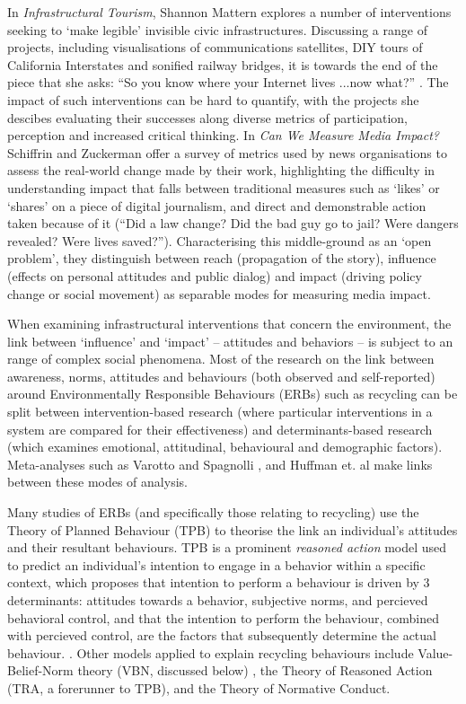 \documentclass[nofonts,nols,justified,nobib]{tufte-book}
\begin{document}
In \emph{Infrastructural Tourism}, Shannon Mattern explores a number of interventions seeking to `make legible' invisible civic infrastructures. Discussing a range of projects, including visualisations of communications satellites, DIY tours of California Interstates and sonified railway bridges, it is towards the end of the piece that she asks: ``So you know where your Internet lives ...now what?'' \cite{mattern_infrastructural_2013}. The impact of such interventions can be hard to quantify, with the projects she descibes evaluating their successes along diverse metrics of participation, perception and increased critical thinking. In \emph{Can We Measure Media Impact?} Schiffrin and Zuckerman offer a survey of metrics used by news organisations to assess the real-world change made by their work, highlighting the difficulty in understanding impact that falls between traditional measures such as `likes' or `shares' on a piece of digital journalism, and direct and demonstrable action taken because of it (``Did a law change? Did the bad guy go to jail? Were dangers revealed? Were lives saved?''). Characterising this middle-ground as an `open problem', they distinguish between reach (propagation of the story), influence (effects on personal attitudes and public dialog) and impact (driving policy change or social movement) as separable modes for measuring media impact. \cite{anya_schiffrin_can_2015}

When examining infrastructural interventions that concern the environment, the link between `influence' and `impact' -- attitudes and behaviors -- is subject to an range of complex social phenomena. Most of the research on the link between awareness, norms, attitudes and behaviours (both observed and self-reported) around Environmentally Responsible Behaviours (ERBs) such as recycling can be split between intervention-based research (where particular interventions in a system are compared for their effectiveness) and determinants-based research (which examines emotional, attitudinal, behavioural and demographic factors). Meta-analyses such as Varotto and Spagnolli \cite{varotto_psychological_2017}, and Huffman et. al \cite{huffman_when_2014} make links between these modes of analysis.

Many studies of ERBs (and specifically those relating to recycling) use the Theory of Planned Behaviour (TPB) to theorise the link an individual's attitudes and their resultant behaviours. TPB is a prominent \emph{reasoned action} model used to predict an individual's intention to engage in a behavior within a specific context, which proposes that intention to perform a behaviour is driven by 3 determinants: attitudes towards a behavior, subjective norms, and percieved behavioral control, and that the intention to perform the behaviour, combined with percieved control, are the factors that subsequently determine the actual behaviour. \cite{ajzen_theory_1991}. Other models applied to explain recycling behaviours include Value-Belief-Norm theory (VBN, discussed below) \cite{huffman_when_2014}, the Theory of Reasoned Action (TRA, a forerunner to TPB), and the Theory of Normative Conduct.
\end{document}

